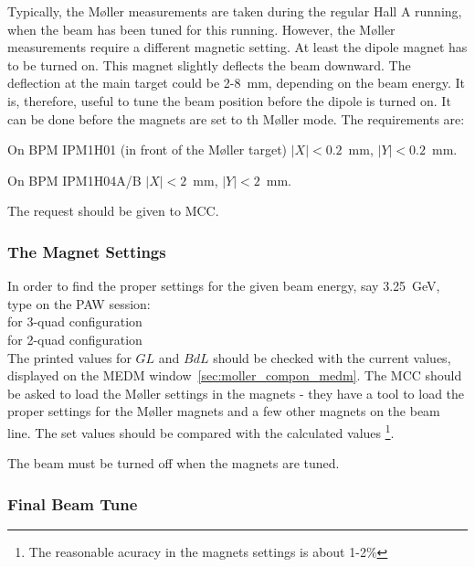 { Typically, the M{\o}ller measurements are taken during the regular Hall A
 running, when the beam has been tuned for this running. However,
 the M{\o}ller measurements require a different magnetic setting.
 At least the dipole magnet has to be turned on. This magnet
 slightly deflects the beam downward. The deflection at the main target
 could be 2-8~mm, depending on the beam energy. It is, therefore, 
 useful to tune the beam position before the dipole is turned on. It can be done
 before the magnets are set to th M{\o}ller mode.
 The requirements are: 
 \begin{list}{--}{\setlength{\itemsep}{-0.15cm}}
   \item On BPM IPM1H01 (in front of the M{\o}ller target) $|X|<0.2$~mm, $|Y|<0.2$~mm.
   \item On BPM IPM1H04A/B $|X|<2$~mm, $|Y|<2$~mm.
 \end{list}
 The request should be given to MCC. 

\subsubsection {The Magnet Settings}
\label{sec:moller_oper_magset}

 In order to find the proper settings for the given beam energy, say 3.25~GeV, 
 type on the PAW session: \\ 
 \hspace*{0.5cm}  for 3-quad configuration \\
 \hspace*{0.5cm}  for 2-quad configuration \\
 The printed values for $GL$ and $BdL$ should be checked with the current values,
 displayed on the MEDM window~\ref{sec:moller_compon_medm}. 
 The MCC should be asked to load the M{\o}ller settings in the magnets -
 they have a tool to load the proper settings for the M{\o}ller
 magnets and a few other magnets on the beam line. 
 The set values should be compared with the calculated values%
 \footnote{The reasonable acuracy in the  magnets settings is about 1-2\%}.
 \begin{safetyen}{5}{2}
   The beam must be turned off when the magnets are tuned.
 \end{safetyen}


\subsubsection {Final Beam Tune}
\label{sec:moller_oper_finalbeam}

}
